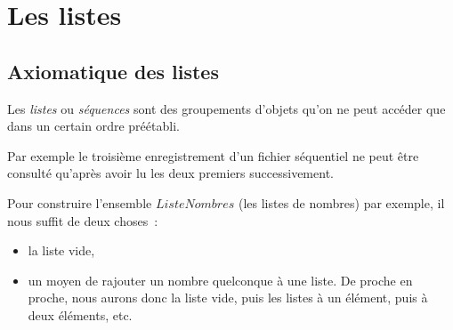 \chapter{Les listes}


\section{Axiomatique des listes}

Les \emph{listes} ou \emph{séquences} sont des groupements d'objets
qu'on ne peut accéder que dans un certain ordre préétabli.

Par exemple le troisième enregistrement d'un fichier séquentiel ne
peut \^etre consulté qu'après avoir lu les deux premiers
successivement.

Pour construire l'ensemble $ListeNombres$ (les listes de
nombres) par exemple, il nous suffit de deux choses~:
\begin{itemize}
\item la liste vide,
\item un moyen de rajouter un nombre quelconque à une liste.
De proche en proche, nous aurons donc la liste vide, puis les listes à un élément, puis à deux éléments, etc. 
\end{itemize}

